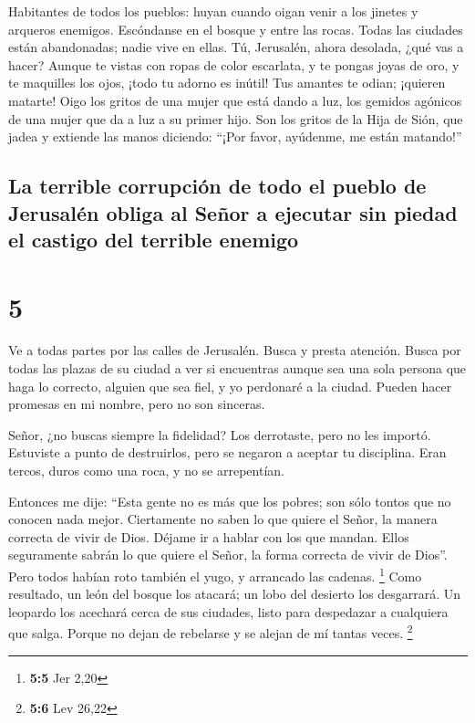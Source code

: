  Habitantes de todos los pueblos: huyan cuando oigan
venir a los jinetes y arqueros enemigos. Escóndanse en el bosque y entre
las rocas. Todas las ciudades están abandonadas; nadie vive en ellas.
 Tú, Jerusalén, ahora desolada, ¿qué vas a hacer? Aunque
te vistas con ropas de color escarlata, y te pongas joyas de oro, y te
maquilles los ojos, ¡todo tu adorno es inútil! Tus amantes te odian;
¡quieren matarte!  Oigo los gritos de una mujer que está
dando a luz, los gemidos agónicos de una mujer que da a luz a su primer
hijo. Son los gritos de la Hija de Sión, que jadea y extiende las manos
diciendo: ``¡Por favor, ayúdenme, me están matando!''

\hypertarget{la-terrible-corrupciuxf3n-de-todo-el-pueblo-de-jerusaluxe9n-obliga-al-seuxf1or-a-ejecutar-sin-piedad-el-castigo-del-terrible-enemigo}{%
\subsection{La terrible corrupción de todo el pueblo de Jerusalén obliga
al Señor a ejecutar sin piedad el castigo del terrible
enemigo}\label{la-terrible-corrupciuxf3n-de-todo-el-pueblo-de-jerusaluxe9n-obliga-al-seuxf1or-a-ejecutar-sin-piedad-el-castigo-del-terrible-enemigo}}

\hypertarget{section-4}{%
\section{5}\label{section-4}}

 Ve a todas partes por las calles de Jerusalén. Busca y
presta atención. Busca por todas las plazas de su ciudad a ver si
encuentras aunque sea una sola persona que haga lo correcto, alguien que
sea fiel, y yo perdonaré a la ciudad.  Pueden hacer
promesas en mi nombre, pero no son sinceras.

 Señor, ¿no buscas siempre la fidelidad? Los derrotaste,
pero no les importó. Estuviste a punto de destruirlos, pero se negaron a
aceptar tu disciplina. Eran tercos, duros como una roca, y no se
arrepentían.

 Entonces me dije: ``Esta gente no es más que los pobres;
son sólo tontos que no conocen nada mejor. Ciertamente no saben lo que
quiere el Señor, la manera correcta de vivir de Dios. 
Déjame ir a hablar con los que mandan. Ellos seguramente sabrán lo que
quiere el Señor, la forma correcta de vivir de Dios''. Pero todos habían
roto también el yugo, y arrancado las cadenas. \footnote{\textbf{5:5}
  Jer 2,20}  Como resultado, un león del bosque los
atacará; un lobo del desierto los desgarrará. Un leopardo los acechará
cerca de sus ciudades, listo para despedazar a cualquiera que salga.
Porque no dejan de rebelarse y se alejan de mí tantas veces. \footnote{\textbf{5:6}
  Lev 26,22}

